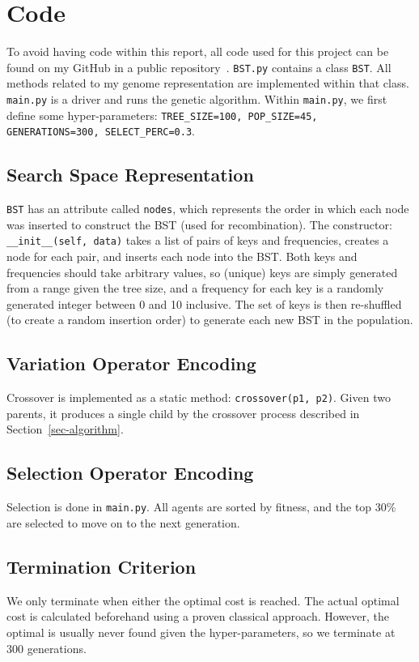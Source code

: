 
\section{Code}

To avoid having code within this report, all code used for this project can be found on my GitHub in a public repository~\cite{project_repository}. \texttt{BST.py} contains a class \texttt{BST}. All methods related to my genome representation are implemented within that class. \texttt{main.py} is a driver and runs the genetic algorithm. Within \texttt{main.py}, we first define some hyper-parameters: \texttt{TREE\_SIZE=100, POP\_SIZE=45, GENERATIONS=300, SELECT\_PERC=0.3}.

\subsection{Search Space Representation}

 \texttt{BST} has an attribute called \texttt{nodes}, which represents the order in which each node was inserted to construct the BST (used for recombination). The constructor: \texttt{\_\_init\_\_(self, data)} takes a list of pairs of keys and frequencies, creates a node for each pair, and inserts each node into the BST. Both keys and frequencies should take arbitrary values, so (unique) keys are simply generated from a range given the tree size, and a frequency for each key is a randomly generated integer between 0 and 10 inclusive. The set of keys is then re-shuffled (to create a random insertion order) to generate each new BST in the population.

 \subsection{Variation Operator Encoding}
Crossover is implemented as a static method: \texttt{crossover(p1, p2)}. Given two parents, it produces a single child by the crossover process described in Section~\ref{sec-algorithm}.

 \subsection{Selection Operator Encoding}
Selection is done in \texttt{main.py}. All agents are sorted by fitness, and the top 30\% are selected to move on to the next generation.

 \subsection{Termination Criterion}
We only terminate when either the optimal cost is reached. The actual optimal cost is calculated beforehand using a proven classical approach. However, the optimal is usually never found given the hyper-parameters, so we terminate at 300 generations.

